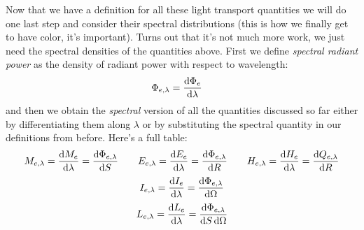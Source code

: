 Now that we have a definition for all these light transport quantities
we will do one last step and consider their spectral distributions (this is how we finally get
to have \gls{color}, it's important). 
Turns out that it's not much more work, we just need the spectral densities of the quantities above. 
First we define \textsl{spectral radiant power} as the density of radiant power with respect to wavelength:
\begin{equation}
	\Phi_{e,\lambda} = \frac{\mathop{}\!\mathrm{d}\Phi_e}{\mathop{}\!\mathrm{d}\lambda} \quad
\end{equation}
and then we obtain the \textsl{spectral} version of all the quantities discussed so far
either by differentiating them along $\lambda$ or by substituting the spectral quantity in our definitions 
from before. Here's a full table:
\begin{equation}
	M_{e,\lambda} = \frac{\d M_e}{\d\lambda} = \frac{\d\Phi_{e,\lambda}}{\d S} \qquad
	E_{e,\lambda} = \frac{\d E_e}{\d\lambda} = \frac{\d\Phi_{e,\lambda}}{\d R} \qquad
	H_{e,\lambda} = \frac{\d H_e}{\d\lambda} = \frac{\d Q_{e,\lambda}}{\d R} 
\end{equation}
\begin{equation}
	I_{e,\lambda} = \frac{\mathop{}\!\mathrm{d} I_e}{\mathop{}\!\mathrm{d}\lambda} = \frac{\mathop{}\!\mathrm{d}\Phi_{e,\lambda}}{\mathop{}\!\mathrm{d}\Omega} 
\end{equation}
\begin{equation}
	L_{e,\lambda} = \frac{\mathop{}\!\mathrm{d} L_e}{\mathop{}\!\mathrm{d}\lambda} = \frac{\mathop{}\!\mathrm{d}\Phi_{e,\lambda}}{\mathop{}\!\mathrm{d} S \mathop{}\!\mathrm{d}\Omega} 
\end{equation}



